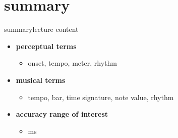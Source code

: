    \section{summary}
        \begin{frame}{summary}{lecture content}
            \begin{itemize}
                \item   \textbf{perceptual terms}
                    \begin{itemize}
                        \item   onset, tempo, meter, rhythm
                    \end{itemize}
                \bigskip
                \item   \textbf{musical terms}
                    \begin{itemize}
                        \item   tempo, bar, time signature, note value, rhythm
                    \end{itemize}
                \bigskip
                \item   \textbf{accuracy range of interest}
                    \begin{itemize}
                        \item   \unit[2--300]{ms}
                    \end{itemize}
            \end{itemize}
            
        \end{frame}

